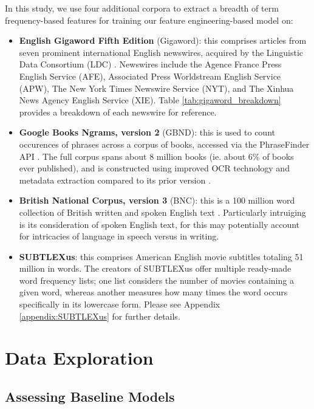 \documentclass{dcthesis}
\theoremstyle{definition}
\theoremstyle{remark}
\begin{document}
In this study, we use four additional corpora to extract a breadth of term frequency-based features for training our feature engineering-based model on:

\begin{itemize}
  \item \textbf{English Gigaword Fifth Edition} (Gigaword): this comprises articles from seven prominent international English newswires, acquired by the Linguistic Data Consortium (LDC) \citep{parker2011english}. Newswires include the Agence France Press English Service (AFE), Associated Press Worldstream English Service (APW), The New York Times Newswire Service (NYT), and The Xinhua News Agency English Service (XIE). Table \ref{tab:gigaword_breakdown} provides a breakdown of each newswire for reference.
  \item \textbf{Google Books Ngrams, version 2} (GBND): this is used to count occurences of phrases across a corpus of books, accessed via the PhraseFinder API \citep{phrasefinder}. The full corpus spans about 8 million books (ie. about 6\% of books ever published), and is constructed using improved OCR technology and metadata extraction compared to its prior version \citep{lin2012syntactic}.
  \item \textbf{British National Corpus, version 3} (BNC): this is a 100 million word collection of British written and spoken English text \citep{bnc2007british}. Particularly intruiging is its consideration of spoken English text, for this may potentially account for intricacies of language in speech versus in writing.
  \item \textbf{SUBTLEXus}: this comprises American English movie subtitles totaling 51 million in words. The creators of SUBTLEXus \citep{brysbaert2009moving} offer multiple ready-made word frequency lists; one list considers the number of movies containing a given word, whereas another measures how many times the word occurs specifically in its lowercase form. Please see Appendix \ref{appendix:SUBTLEXus} for further details.
\end{itemize}

\chapter{Data Exploration}

\section{Assessing Baseline Models}
\end{document}

